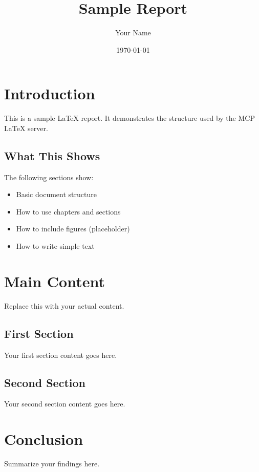 \documentclass[12pt,a4paper]{report}
\title{Sample Report}
\author{Your Name}
\date{\today}
\begin{document}
\maketitle

\tableofcontents

\chapter{Introduction}

This is a sample LaTeX report. It demonstrates the structure used by the MCP LaTeX server.

\section{What This Shows}

The following sections show:
\begin{itemize}
    \item Basic document structure
    \item How to use chapters and sections
    \item How to include figures (placeholder)
    \item How to write simple text
\end{itemize}

\chapter{Main Content}

Replace this with your actual content.

\section{First Section}

Your first section content goes here.

\section{Second Section}

Your second section content goes here.

\chapter{Conclusion}

Summarize your findings here.
\end{document}
